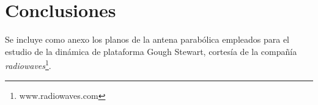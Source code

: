 \documentclass[article]{IEEEtran}
\begin{document}
\section{Conclusiones}






\appendix

Se incluye como anexo los planos de la antena parabólica empleados para el 
estudio de la dinámica
de plataforma Gough Stewart, cortesía de la compañía \emph{radiowaves}\footnote{www.radiowaves.com}.






% 
\end{document}
